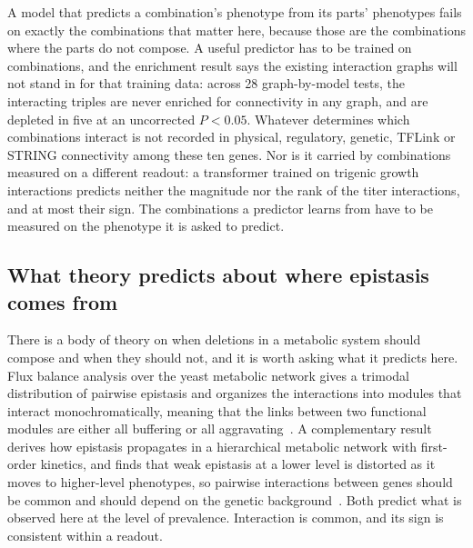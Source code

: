  A model that predicts a combination's
phenotype from its parts' phenotypes fails on exactly the combinations that matter here,
because those are the combinations where the parts do not compose. A useful predictor has to
be trained on combinations, and the enrichment result says the existing interaction graphs
will not stand in for that training data: across 28 graph-by-model tests, the interacting
triples are never enriched for connectivity in any graph, and are depleted in five at an
uncorrected $P < 0.05$. Whatever determines which combinations interact is not recorded in physical,
regulatory, genetic, TFLink or STRING connectivity among these ten genes. Nor is it carried
by combinations measured on a different readout: a transformer trained on trigenic growth
interactions predicts neither the magnitude nor the rank of the titer interactions, and at
most their sign. The combinations a predictor learns from have to be measured on the
phenotype it is asked to predict.

\subsection*{What theory predicts about where epistasis comes from}

There is a body of theory on when deletions in a metabolic system should compose and when
they should not, and it is worth asking what it predicts here. Flux balance analysis over
the yeast metabolic network gives a trimodal distribution of pairwise epistasis and
organizes the interactions into modules that interact monochromatically, meaning that the
links between two functional modules are either all buffering or all
aggravating~\citep{segreModularEpistasisYeast2005}. A complementary result derives how
epistasis propagates in a hierarchical metabolic network with first-order kinetics, and
finds that weak epistasis at a lower level is distorted as it moves to higher-level
phenotypes, so pairwise interactions between genes should be common and should depend on
the genetic background~\citep{kryazhimskiyEmergencePropagationEpistasis2021}. Both predict
what is observed here at the level of prevalence. Interaction is common, and its sign is
consistent within a readout.

